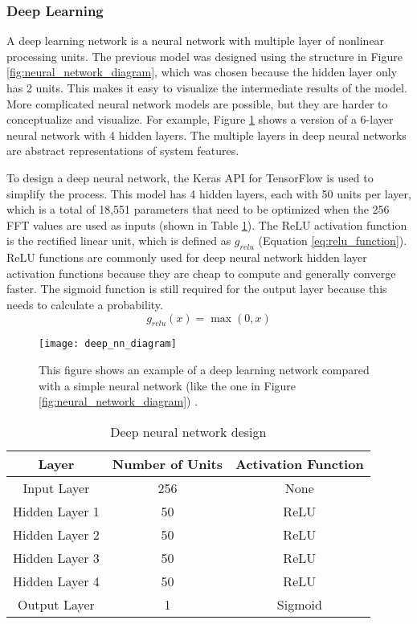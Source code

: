 \subsubsection{Deep Learning}
A deep learning network is a neural network with multiple layer of nonlinear processing units.  The previous model was designed using the structure in Figure \ref{fig:neural_network_diagram}, which was chosen because the hidden layer only has 2 units.  This makes it easy to visualize the intermediate results of the model.  More complicated neural network models are possible, but they are harder to conceptualize and visualize.  For example, Figure \ref{fig:deep_nn_diagram} shows a version of a 6-layer neural network with 4 hidden layers.  The multiple layers in deep neural networks are abstract representations of system features.

To design a deep neural network, the Keras \cite{keras} API for TensorFlow \cite{tensorflow} is used to simplify the process.  This model has 4 hidden layers, each with 50 units per layer, which is a total of 18,551 parameters that need to be optimized when the 256 FFT values are used as inputs (shown in Table \ref{t:deep_nn_design}).  The ReLU activation function is the rectified linear unit, which is defined as $g_{relu}$ (Equation \ref{eq:relu_function}).  ReLU functions are commonly used for deep neural network hidden layer activation functions because they are cheap to compute and generally converge faster.  The sigmoid function is still required for the output layer because this needs to calculate a probability.
\begin{equation} \label{eq:relu_function}
	g_{relu}(x) = \max{(0, x)}
\end{equation}

\begin{figure}
\centering
\texttt{[image: deep\_nn\_diagram]}
\decoRule
\caption{This figure shows an example of a deep learning network compared with a simple neural network (like the one in Figure \ref{fig:neural_network_diagram}) \cite{mnist_deep_learning}.}
\label{fig:deep_nn_diagram}
\end{figure}

\begin{table}[]
\centering
\caption{Deep neural network design}
\label{t:deep_nn_design}
\vspace*{0.2in}
\begin{tabular}{|c|c|c|}
\rowcolor[HTML]{EFEFEF} 
\hline
\textbf{Layer} & \textbf{Number of Units} & \textbf{Activation Function} \\ \hline
Input Layer & 256 & None \\ \hline
Hidden Layer 1 & 50 & ReLU \\ \hline
Hidden Layer 2 & 50 & ReLU \\ \hline
Hidden Layer 3 & 50 & ReLU \\ \hline
Hidden Layer 4 & 50 & ReLU \\ \hline
Output Layer & 1 & Sigmoid \\ \hline
\end{tabular}
\end{table}

